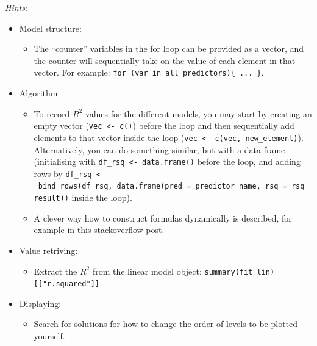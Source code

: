 \documentclass[
]{book}
\newenvironment{Shaded}{\begin{snugshade}}{\end{snugshade}}
\newcommand{\CommentTok}[1]{\textcolor[rgb]{0.56,0.35,0.01}{\textit{#1}}}
\newcommand{\KeywordTok}[1]{\textcolor[rgb]{0.13,0.29,0.53}{\textbf{#1}}}
\newcommand{\NormalTok}[1]{#1}
\newcommand{\OperatorTok}[1]{\textcolor[rgb]{0.81,0.36,0.00}{\textbf{#1}}}
\newcommand{\StringTok}[1]{\textcolor[rgb]{0.31,0.60,0.02}{#1}}
\providecommand{\tightlist}{%
  \setlength{\itemsep}{0pt}\setlength{\parskip}{0pt}}
\begin{document}
\emph{Hints}:

\begin{itemize}
\item
  Model structure:

  \begin{itemize}
  \tightlist
  \item
    The ``counter'' variables in the for loop can be provided as a vector, and the counter will sequentially take on the value of each element in that vector. For example: \texttt{for\ (var\ in\ all\_predictors)\{\ ...\ \}}.
  \end{itemize}
\item
  Algorithm:

  \begin{itemize}
  \item
    To record \(R^2\) values for the different models, you may start by creating an empty vector (\texttt{vec\ \textless{}-\ c()}) before the loop and then sequentially add elements to that vector inside the loop (\texttt{vec\ \textless{}-\ c(vec,\ new\_element)}). Alternatively, you can do something similar, but with a data frame (initialising with \texttt{df\_rsq\ \textless{}-\ data.frame()} before the loop, and adding rows by \texttt{df\_rsq\ \textless{}-\ bind\_rows(df\_rsq,\ data.frame(pred\ =\ predictor\_name,\ rsq\ =\ rsq\_result))} inside the loop).
  \item
    A clever way how to construct formulas dynamically is described, for example in \href{https://stackoverflow.com/questions/4951442/formula-with-dynamic-number-of-variables}{this stackoverflow post}.
  \end{itemize}
\item
  Value retriving:

  \begin{itemize}
  \tightlist
  \item
    Extract the \(R^2\) from the linear model object: \texttt{summary(fit\_lin){[}{[}"r.squared"{]}{]}}
  \end{itemize}
\item
  Displaying:

  \begin{itemize}
  \tightlist
  \item
    Search for solutions for how to change the order of levels to be plotted yourself.
  \end{itemize}
\end{itemize}

\begin{Shaded}
\end{Shaded}
\end{document}
